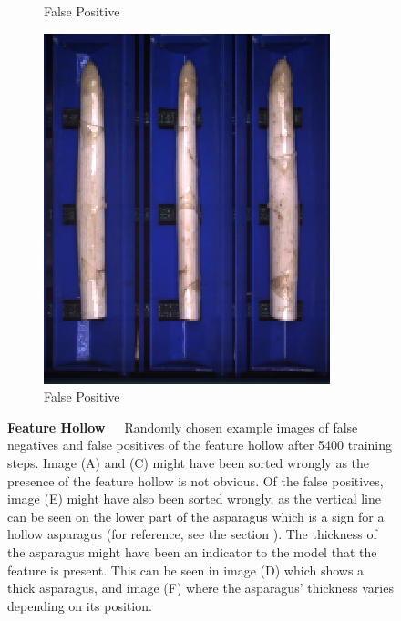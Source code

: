 \begin{figure}[!htb]
\begin{subfigure}{0.3\textwidth}
		\vspace{-5pt}
		\caption{False Positive}
	\end{subfigure}
	\begin{subfigure}{0.3\textwidth}
		\includegraphics[width=0.9\linewidth]{Figures/chapter04/hollow_falsepositive_03.png}
		\vspace{-5pt}
		\caption{False Positive}
	\end{subfigure}
	\vspace{-5pt}
\caption[Single-Label CNN Example Images Feature Hollow]{\textbf{Feature Hollow}~~~Randomly chosen example images of false negatives and false positives of the feature hollow after 5400 training steps. Image (A) and (C) might have been sorted wrongly as the presence of the feature hollow is not obvious. Of the false positives, image (E) might have also been sorted wrongly, as the vertical line can be seen on the lower part of the asparagus which is a sign for a hollow asparagus (for reference, see the section ). The thickness of the asparagus might have been an indicator to the model that the feature is present. This can be seen in image (D) which shows a thick asparagus, and image (F) where the asparagus' thickness varies depending on its position.}
    \label{fig:ExampleImagesHollow}
\end{figure}

